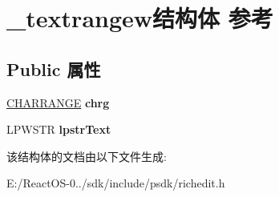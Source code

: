 \hypertarget{struct__textrangew}{}\section{\+\_\+textrangew结构体 参考}
\label{struct__textrangew}
\subsection*{Public 属性}
\begin{DoxyCompactItemize}
\item 
\mbox{\label{struct__textrangew_a2c81ce67d15ac037ca7be1e5dbda66c5}} 
\hyperlink{struct__charrange}{C\+H\+A\+R\+R\+A\+N\+GE} {\bfseries chrg}
\item 
\mbox{\label{struct__textrangew_aed215520607a62fde38e731d6a4460f0}} 
L\+P\+W\+S\+TR {\bfseries lpstr\+Text}
\end{DoxyCompactItemize}


该结构体的文档由以下文件生成\+:\begin{DoxyCompactItemize}
\item 
E\+:/\+React\+O\+S-\/0../sdk/include/psdk/richedit.\+h\end{DoxyCompactItemize}
